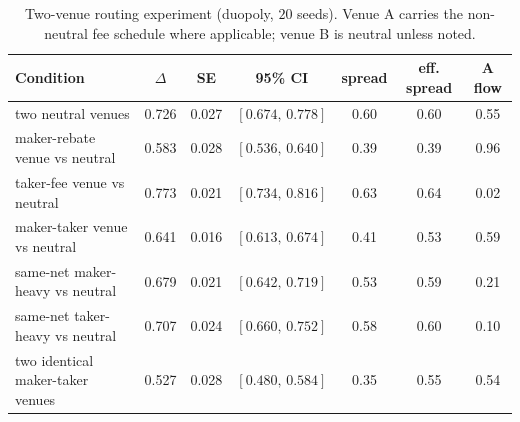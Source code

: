 \begin{table}[t]
\centering
\caption{Two-venue routing experiment (duopoly, $20$ seeds). Venue A carries the non-neutral fee schedule where applicable; venue B is neutral unless noted.}
\label{tab:two-venue-routing}
\small
\begin{tabular}{@{}lcccccc@{}}
\toprule
Condition & $\Delta$ & SE & 95\% CI & spread & eff. spread & A flow \\
\midrule
two neutral venues & 0.726 & 0.027 & $[0.674,\,0.778]$ & 0.60 & 0.60 & 0.55 \\
maker-rebate venue vs neutral & 0.583 & 0.028 & $[0.536,\,0.640]$ & 0.39 & 0.39 & 0.96 \\
taker-fee venue vs neutral & 0.773 & 0.021 & $[0.734,\,0.816]$ & 0.63 & 0.64 & 0.02 \\
maker-taker venue vs neutral & 0.641 & 0.016 & $[0.613,\,0.674]$ & 0.41 & 0.53 & 0.59 \\
same-net maker-heavy vs neutral & 0.679 & 0.021 & $[0.642,\,0.719]$ & 0.53 & 0.59 & 0.21 \\
same-net taker-heavy vs neutral & 0.707 & 0.024 & $[0.660,\,0.752]$ & 0.58 & 0.60 & 0.10 \\
two identical maker-taker venues & 0.527 & 0.028 & $[0.480,\,0.584]$ & 0.35 & 0.55 & 0.54 \\
\bottomrule
\end{tabular}
\end{table}
